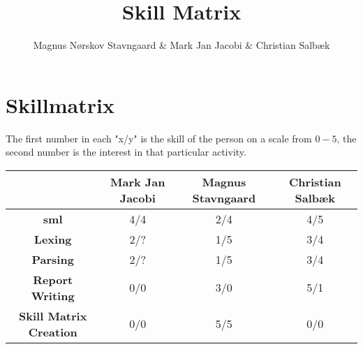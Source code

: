 \documentclass[a4,11pt]{article}
\title{Skill Matrix}
\author{Magnus N\o rskov Stavngaard \& Mark Jan Jacobi \& Christian Salb\ae k}
\begin{document}
    \maketitle
    \newpage

    \section{Skillmatrix}
    The first number in each "x/y" is the skill of the person on a scale from
    $0-5$, the second number is the interest in that particular activity.\\

    \begin{tabular}{|c|c|c|c|}
        \hline
        & \textbf{Mark Jan Jacobi} & \textbf{Magnus Stavngaard} &
          \textbf{Christian Salb\ae k} \\
        \hline
        \textbf{sml}                   & 4/4 & 2/4 & 4/5 \\
        \hline
        \textbf{Lexing}                & 2/? & 1/5 & 3/4 \\
        \hline
        \textbf{Parsing}               & 2/? & 1/5 & 3/4 \\
        \hline
        \textbf{Report Writing}        & 0/0 & 3/0 & 5/1 \\
        \hline
        \textbf{Skill Matrix Creation} & 0/0 & 5/5 & 0/0 \\
        \hline
    \end{tabular}
\end{document}
